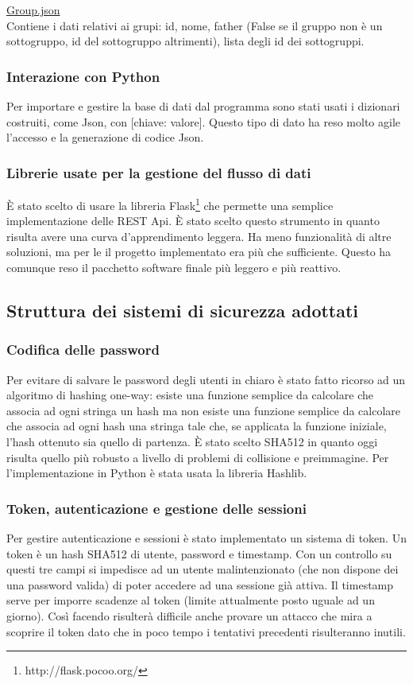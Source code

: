 \documentclass[12pt]{scrartcl}
\begin{document}
    \underline{Group.json}\\
        Contiene i dati relativi ai grupi: id, nome, father (False se il gruppo non \`e un sottogruppo,
        id del sottogruppo altrimenti), lista degli id dei sottogruppi.\\
        
\subsubsection{Interazione con Python}
    Per importare e gestire la base di dati dal programma sono stati usati i dizionari costruiti,
    come Json, con [chiave: valore]. Questo tipo di dato ha reso molto agile
    l'accesso e la generazione di codice Json.

\subsubsection{Librerie usate per la gestione del flusso di dati}
\`E stato scelto di usare la libreria Flask\footnote{http://flask.pocoo.org/} che permette
una semplice implementazione delle REST Api. \`E stato scelto questo strumento in quanto
risulta avere una curva d'apprendimento leggera. Ha meno funzionalit\`a di altre soluzioni,
ma per le il progetto implementato era pi\`u che sufficiente. Questo ha comunque reso
il pacchetto software finale pi\`u leggero e pi\`u reattivo.

\subsection{Struttura dei sistemi di sicurezza adottati}
\subsubsection{Codifica delle password}
    Per evitare di salvare le password degli utenti in chiaro
    \`e stato fatto ricorso ad un algoritmo di hashing one-way:
    esiste una funzione semplice da calcolare che associa ad ogni stringa un hash
    ma non esiste una funzione semplice da calcolare che associa ad ogni hash una stringa
    tale che, se applicata la funzione iniziale, l'hash ottenuto sia quello di partenza.
    \`E stato scelto SHA512 in quanto oggi risulta quello pi\`u robusto a 
    livello di problemi di collisione e preimmagine. Per l'implementazione in Python
    \`e stata usata la libreria Hashlib.
\subsubsection{Token, autenticazione e gestione delle sessioni}
    Per gestire autenticazione e sessioni \`e stato implementato un sistema di
    token. Un token \`e un hash SHA512 di utente, password e timestamp. Con un controllo
    su questi tre campi si impedisce ad un utente malintenzionato (che non dispone dei una
    password valida) di poter accedere ad una sessione gi\`a attiva. 
    Il timestamp serve per imporre scadenze al token (limite attualmente posto
    uguale ad un giorno). Cos\`i facendo risulter\`a difficile anche provare un
    attacco che mira a scoprire il token dato che in poco tempo i tentativi precedenti
    risulteranno inutili.
\end{document}
